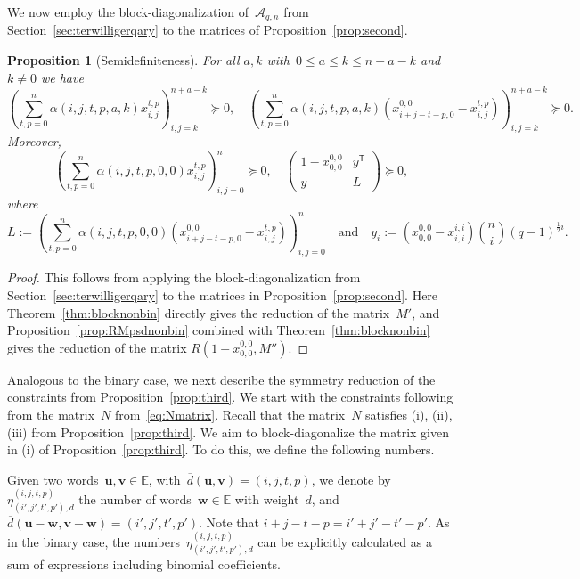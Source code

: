 \documentclass[10pt,a4paper]{article}
\newtheorem{proposition}[theorem]{Proposition}
\theoremstyle{definition}
\newcommand{\uu}{\mathbf{u}}
\newcommand{\vv}{\mathbf{v}}
\newcommand{\ww}{\mathbf{w}}
\newcommand{\T}{^{\mathsf{T}}}
\begin{document}
We now employ the block-diagonalization of~$\mathcal{A}_{q,n}$ from Section~\ref{sec:terwilligerqary} to the matrices of Proposition~\ref{prop:second}.

\begin{proposition}[Semidefiniteness]\label{prop:secondqary}
For all $a,k$ with~$0 \leq a \leq k \leq n+a-k$ and $k \neq 0$ we have
\begin{equation}\label{constraints:qaryterwilliger}
\left(\sum_{t,p=0}^n \alpha(i,j,t,p,a,k) x_{i,j}^{t,p}  \right)_{i,j=k}^{n+a-k} \succeq 0, \quad \left(\sum_{t,p=0}^n \alpha(i,j,t,p,a,k)(x^{0,0}_{i+j-t-p,0}-x_{i,j}^{t,p})  \right)_{i,j=k}^{n+a-k} \succeq 0.
\end{equation}
Moreover, 
\begin{equation}
\left(\sum_{t,p=0}^n \alpha(i,j,t,p,0,0) x_{i,j}^{t,p}  \right)_{i,j=0}^{n} \succeq 0, \quad \begin{pmatrix}1-x_{0,0}^{0,0} & y\T \\ y & L \end{pmatrix} \succeq 0,
\end{equation}
where 
\begin{equation*}
L:= \left(\sum_{t,p=0}^n \alpha(i,j,t,p,0,0)(x^{0,0}_{i+j-t-p,0}-x_{i,j}^{t,p})\right)_{i,j=0}^{n}\quad \text{and}\quad y_i:= (x_{0,0}^{0,0} - x_{i,i}^{i,i})\binom{n}{i} (q-1)^{\tfrac{1}{2}i}.
\end{equation*}
\end{proposition}
\begin{proof} 
This follows from applying the block-diagonalization from Section~\ref{sec:terwilligerqary} to the matrices in Proposition~\ref{prop:second}. Here Theorem~\ref{thm:blocknonbin} directly gives the reduction of the matrix~$M'$, and  Proposition~\ref{prop:RMpsdnonbin} combined with  Theorem~\ref{thm:blocknonbin} gives the reduction of the matrix $R(1-x_{0,0}^{0,0},M'')$.
\end{proof} 

Analogous to the binary case, we next describe the symmetry reduction of the constraints from Proposition~\ref{prop:third}. We start with the constraints following from the matrix~$N$ from~\eqref{eq:Nmatrix}. Recall that the matrix~$N$ satisfies (i), (ii), (iii) from Proposition~\ref{prop:third}. We aim to block-diagonalize the matrix given in (i) of Proposition~\ref{prop:third}. To do this, we define the following numbers.


Given two words~$\uu,\vv \in \mathbb{E}$, with~$\overline{d}(\uu,\vv)=(i,j,t,p)$, we denote by $\eta_{(i',j',t',p'),d}^{(i,j,t,p)}$ the number of words~$\ww \in \mathbb{E}$ with weight~$d$, and~$\overline{d}(\uu-\ww,\vv-\ww)=(i',j',t',p')$. Note that $i+j-t-p = i' + j' -t'-p'$. As in the binary case, the numbers~$\eta_{(i',j',t',p'),d}^{(i,j,t,p)}$ can be explicitly calculated as a sum of expressions including binomial coefficients.
\end{document}
